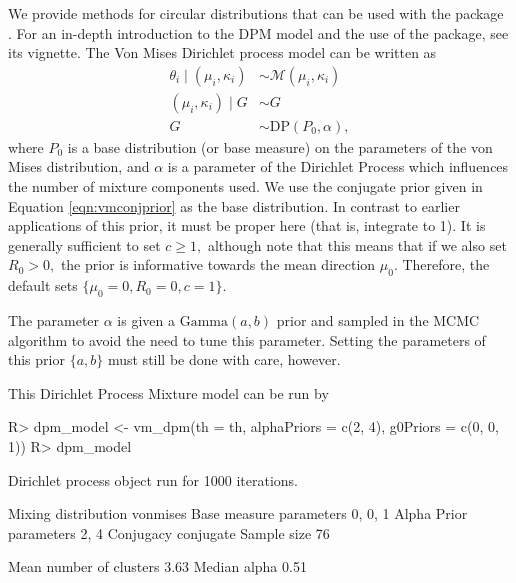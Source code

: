 We provide methods for circular distributions that can be used with the
 package \citep{dirichletprocesspackage}. For an
in-depth introduction to the DPM model and the use of the
 package, see its vignette. The Von Mises
Dirichlet process model can be written as \begin{align}
\theta_i \mid (\mu_i, \kappa_i) &\sim \mathcal{M}(\mu_i, \kappa_i) \\
(\mu_i, \kappa_i) \mid G  &\sim G \\
G &\sim \text{DP}(P_0, \alpha),
\end{align} where \(P_0\) is a base distribution (or base measure) on
the parameters of the von Mises distribution, and \(\alpha\) is a
parameter of the Dirichlet Process which influences the number of
mixture components used. We use the conjugate prior given in Equation
\ref{eqn:vmconjprior} as the base distribution. In contrast to earlier
applications of this prior, it must be proper here (that is, integrate
to 1). It is generally sufficient to set \(c \geq 1,\) although note
that this means that if we also set \(R_0 > 0,\) the prior is
informative towards the mean direction \(\mu_0\). Therefore, the default
sets \(\{\mu_0 = 0, R_0 = 0, c = 1\}.\)

The parameter \(\alpha\) is given a \(\text{Gamma}(a, b)\) prior and
sampled in the MCMC algorithm to avoid the need to tune this parameter.
Setting the parameters of this prior \(\{a, b\}\) must still be done
with care, however.

This Dirichlet Process Mixture model can be run by

\begin{CodeChunk}

\begin{CodeInput}
R> dpm_model <- vm_dpm(th = th, alphaPriors = c(2, 4), g0Priors = c(0, 0, 1))
R> dpm_model
\end{CodeInput}

\begin{CodeOutput}
Dirichlet process object run for 1000 iterations.
                                    
  Mixing distribution       vonmises
  Base measure parameters    0, 0, 1
  Alpha Prior parameters        2, 4
  Conjugacy                conjugate
  Sample size                     76
                                    
  Mean number of clusters       3.63
  Median alpha                  0.51
\end{CodeOutput}
\end{CodeChunk}

